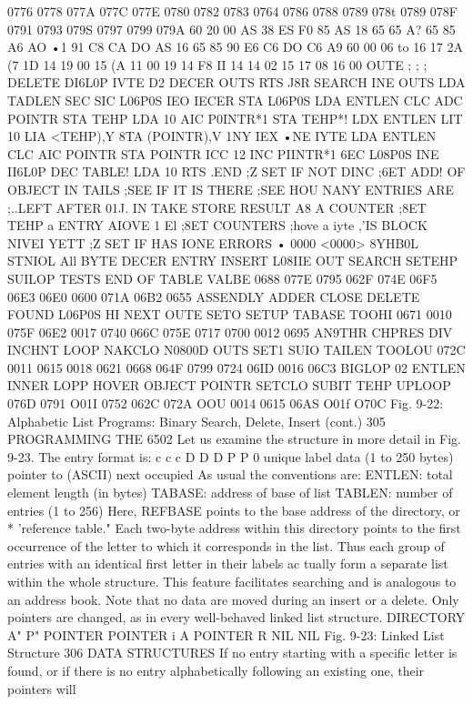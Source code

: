 \documentclass{book}
\begin{document}
{{{{{{{{{{0776
0778
077A
077C
077E
0780
0782
0783
0764
0786
0788
0789
078t
0789
078F
0791
0793
079S
0797
0799
079A
60
20
00
AS
38
ES
F0
85
AS
18
65
65
A?
65
85
A6
AO
•1
91
C8
CA
DO
AS
16
65
85
90
E6
C6
DO
C6
A9
60
00 06
to
16
17
2A
(7
1D
14
19
00
15
(A
11
00
19
14
F8
II
14
14
02
15
17
08
16
00
OUTE
;
;
;
DELETE
DI6L0P
IVTE
D2
DECER
OUTS
RTS
J8R SEARCH
INE OUTS
LDA TADLEN
SEC
SIC L06P0S
IEO IECER
STA L06P0S
LDA ENTLEN
CLC
ADC POINTR
STA TEHP
LDA 10
AIC P0INTR*1
STA TEHP*!
LDX ENTLEN
LIT 10
LIA <TEHP),Y
8TA (POINTR),V
1NY
IEX
•NE IYTE
LDA ENTLEN
CLC
AIC POINTR
STA POINTR
ICC 12
INC PIINTR*1
6EC L08P0S
INE II6L0P
DEC TABLE!
LDA 10
RTS
.END
;Z SET IF NOT DINC
;6ET ADD! OF OBJECT IN TAILS
;SEE IF IT IS THERE
;SEE HOU NANY ENTRIES ARE
;..LEFT AFTER 01J. IN TAKE
}STORE RESULT A8 A COUNTER
;8ET TEHP a ENTRY AIOVE 1 El
;8ET COUNTERS
;hove a iyte
,'IS BLOCK NIVEI YETT
;Z SET IF HAS IONE
ERRORS • 0000 <0000>
8YHB0L
STNIOL
All
BYTE
DECER
ENTRY
INSERT
L08IIE
OUT
SEARCH
SETEHP
SUILOP
TESTS
END OF
TABLE
VALBE
0688
077E
0795
062F
074E
06F5
06E3
06E0
0600
071A
06B2
0655
ASSENDLY
ADDER
CLOSE
DELETE
FOUND
L06P0S
HI
NEXT
OUTE
SETO
SETUP
TABASE
TOOHI
0671
0010
075F
06E2
0017
0740
066C
075E
0717
0700
0012
0695
AN9THR
CHPRES
DIV
INCHNT
LOOP
NAKCLO
N0800D
OUTS
SET1
SUIO
TAILEN
TOOLOU
072C
0011
0615
0018
0621
0668
064F
0799
0724
06ID
0016
06C3
BIGLOP
02
ENTLEN
INNER
LOPP
HOVER
OBJECT
POINTR
SETCLO
SUBIT
TEHP
UPLOOP
076D
0791
O01I
0752
062C
072A
OOU
0014
0615
06AS
O01f
O70C
Fig. 9-22: Alphabetic List Programs: Binary Search, Delete, Insert (cont.)
305
PROGRAMMING THE 6502
Let us examine the structure in more detail in Fig. 9-23.
The entry format is:
c c c D D D P P 0
unique label data (1 to 250 bytes) pointer to
(ASCII) next
occupied
As usual the conventions are:
ENTLEN: total element length (in bytes)
TABASE: address of base of list
TABLEN: number of entries (1 to 256)
Here, REFBASE points to the base address of the directory, or
* 'reference table."
Each two-byte address within this directory points to the first
occurrence of the letter to which it corresponds in the list. Thus
each group of entries with an identical first letter in their labels ac
tually form a separate list within the whole structure. This feature
facilitates searching and is analogous to an address book. Note
that no data are moved during an insert or a delete. Only pointers
are changed, as in every well-behaved linked list structure.
DIRECTORY
A"
P"
POINTER
POINTER
i A
POINTER
R
NIL
NIL
Fig. 9-23: Linked List Structure
306
DATA STRUCTURES
If no entry starting with a specific letter is found, or if there is no
entry alphabetically following an existing one, their pointers will
}}}}}}}}}
\end{document}
